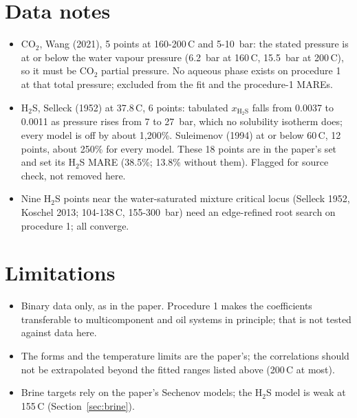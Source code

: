 \documentclass[10pt,a4paper]{article}
\begin{document}
\section{Data notes}\label{sec:data}
\begin{itemize}
\item CO$_2$, Wang (2021), 5 points at 160-200\,\textdegree C and 5-10~bar: the stated pressure is at or below the water vapour pressure (6.2~bar at 160\,\textdegree C, 15.5~bar at 200\,\textdegree C), so it must be CO$_2$ partial pressure. No aqueous phase exists on procedure 1 at that total pressure; excluded from the fit and the procedure-1 MAREs.
\item H$_2$S, Selleck (1952) at 37.8\,\textdegree C, 6 points: tabulated $x_{\mathrm{H_2S}}$ falls from 0.0037 to 0.0011 as pressure rises from 7 to 27~bar, which no solubility isotherm does; every model is off by about 1,200\%. Suleimenov (1994) at or below 60\,\textdegree C, 12 points, about 250\% for every model. These 18 points are in the paper's set and set its H$_2$S MARE (38.5\%; 13.8\% without them). Flagged for source check, not removed here.
\item Nine H$_2$S points near the water-saturated mixture critical locus (Selleck 1952, Koschel 2013; 104-138\,\textdegree C, 155-300~bar) need an edge-refined root search on procedure 1; all converge.
\end{itemize}

\section{Limitations}
\begin{itemize}
\item Binary data only, as in the paper. Procedure 1 makes the coefficients transferable to multicomponent and oil systems in principle; that is not tested against data here.
\item The forms and the temperature limits are the paper's; the correlations should not be extrapolated beyond the fitted ranges listed above (200\,\textdegree C at most).
\item Brine targets rely on the paper's Sechenov models; the H$_2$S model is weak at 155\,\textdegree C (Section~\ref{sec:brine}).
\end{itemize}
\end{document}
